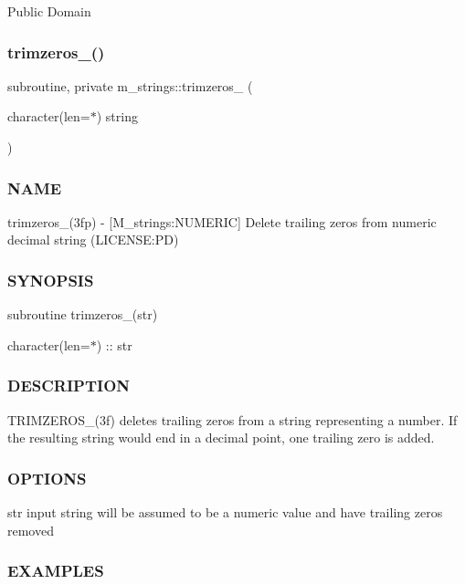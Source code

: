 Public Domain \mbox{\label{namespacem__strings_aedbeefa963a63edc16b10e2a833eb609}} 
\subsubsection{\texorpdfstring{trimzeros\+\_\+()}{trimzeros\_()}}
{\footnotesize\ttfamily subroutine, private m\+\_\+strings\+::trimzeros\+\_\+ (\begin{DoxyParamCaption}\item[{character(len=$\ast$)}]{string }\end{DoxyParamCaption})\hspace{0.3cm}{\ttfamily [private]}}



\subsubsection*{N\+A\+ME}

trimzeros\+\_\+(3fp) -\/ \mbox{[}M\+\_\+strings\+:N\+U\+M\+E\+R\+IC\mbox{]} Delete trailing zeros from numeric decimal string (L\+I\+C\+E\+N\+SE\+:PD) \subsubsection*{S\+Y\+N\+O\+P\+S\+IS}

subroutine trimzeros\+\_\+(str)

character(len=$\ast$) \+:\+: str \subsubsection*{D\+E\+S\+C\+R\+I\+P\+T\+I\+ON}

T\+R\+I\+M\+Z\+E\+R\+O\+S\+\_\+(3f) deletes trailing zeros from a string representing a number. If the resulting string would end in a decimal point, one trailing zero is added. \subsubsection*{O\+P\+T\+I\+O\+NS}

str input string will be assumed to be a numeric value and have trailing zeros removed \subsubsection*{E\+X\+A\+M\+P\+L\+ES}

